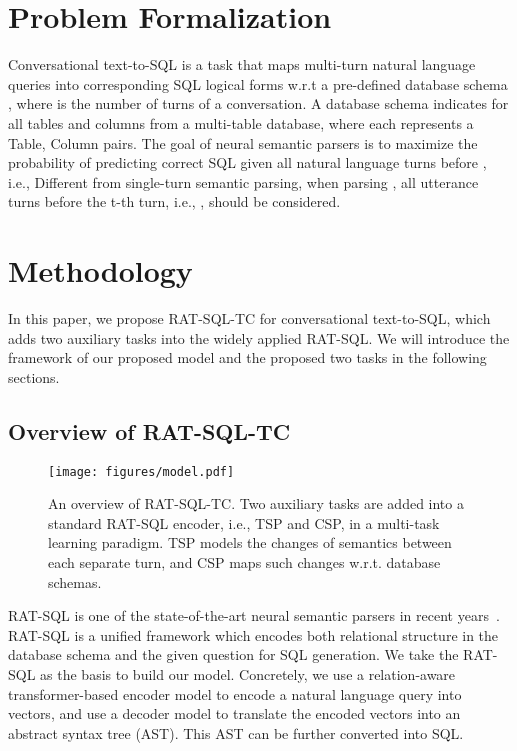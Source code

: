 \documentclass[a4paper]{article}
\begin{document}
\section{Problem Formalization}

Conversational text-to-SQL is a task that maps multi-turn natural language queries  into corresponding SQL logical forms  w.r.t a pre-defined database schema , where  is the number of turns of a conversation. A database schema  indicates for all tables and columns from a multi-table database, where each  represents a Table, Column pairs. The goal of neural semantic parsers is to maximize the probability of predicting correct SQL  given all natural language turns before , i.e.,
Different from single-turn semantic parsing, when parsing , all utterance turns before the t-th turn, i.e., , should be considered.

\section{Methodology}

In this paper, we propose RAT-SQL-TC for conversational text-to-SQL, which adds two auxiliary tasks into the widely applied RAT-SQL. We will introduce the framework of our proposed model and the proposed two tasks in the following sections.

\subsection{Overview of RAT-SQL-TC}

\begin{figure*}[htbp]
    \centering
    \texttt{[image: figures/model.pdf]}
    \caption{An overview of RAT-SQL-TC. Two auxiliary tasks are added into a standard RAT-SQL encoder, i.e., TSP and CSP, in a multi-task learning paradigm. TSP models the changes of semantics between each separate turn, and CSP maps such changes w.r.t. database schemas.}
    \label{fig:model}
\end{figure*}

RAT-SQL is one of the state-of-the-art neural semantic parsers in recent years~\cite{wang2019rat}. RAT-SQL is a unified framework which encodes both relational structure in the database schema and the given question for SQL generation. We take the RAT-SQL as the basis to build our model. Concretely, we use a relation-aware transformer-based encoder model to encode a natural language query into vectors, and use a decoder model to translate the encoded vectors into an abstract syntax tree (AST). This AST can be further converted into SQL.
\end{document}
